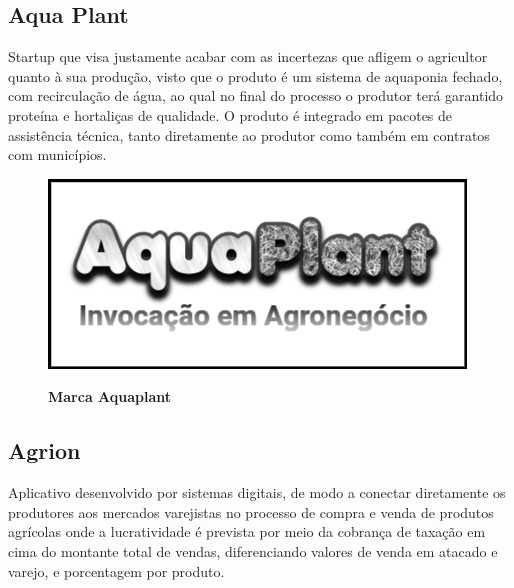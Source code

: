 \subsection{Aqua Plant}

Startup que visa justamente acabar com as incertezas que afligem o agricultor quanto à sua produção, visto que o produto é um sistema de aquaponia fechado, com recirculação de água, ao qual no final do processo o produtor terá garantido proteína e hortaliças de qualidade.
O produto é integrado em pacotes de assistência técnica, tanto diretamente ao produtor como também em contratos com municípios.


\begin{figure}[H]
\centering
\caption{\textbf{Marca Aquaplant}}
\includegraphics[scale=0.5]{Imagens/aquaplant.png}
\label{figura_13}
\end{figure}


\subsection{Agrion}

Aplicativo desenvolvido por sistemas digitais, de modo a conectar diretamente os produtores aos mercados varejistas no processo de compra e venda de produtos agrícolas onde a lucratividade é prevista por meio da cobrança de taxação em cima do montante total de vendas, diferenciando valores de venda em atacado e varejo, e porcentagem por produto.


